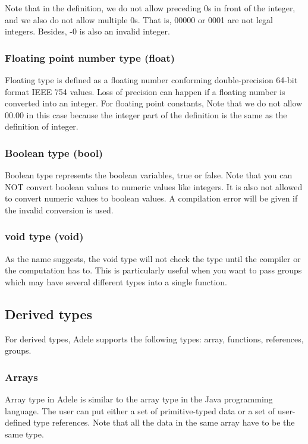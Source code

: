 \documentclass[11pt,letterpaper]{article}
\begin{document}
Note that in the definition, we do not allow preceding 0s in front of the integer, and we also do not allow multiple 0s. That is, 00000 or 0001 are not legal integers. Besides, -0 is also an invalid integer.

 \subsubsection*{Floating point number type (float)} 
Floating type is defined as a floating number conforming double-precision 64-bit format IEEE 754 values. Loss of precision can happen if a floating number is converted into an integer. For floating point constants, Note that we do not allow 00.00 in this case because the integer part of the definition is the same as the definition of integer.

\subsubsection*{Boolean type (bool)} 
Boolean type represents the boolean variables, true or false. Note that you can NOT convert boolean values to numeric values like integers. It is also not allowed to convert numeric values to boolean values. A compilation error will be given if the invalid conversion is used.

\subsubsection*{void type (void)} 
As the name suggests, the void type will not check the type until the compiler or the computation has to. This is particularly useful when you want to pass groups which may have several different types into a single function.


\subsection{Derived types}
For derived types, Adele supports the following types: array, functions, references, groups.

\subsubsection*{Arrays}
Array type in Adele is similar to the array type in the Java programming language. The user can put either a set of primitive-typed data or a set of user-defined type references. Note that all the data in the same array have to be the same type.
\end{document}
